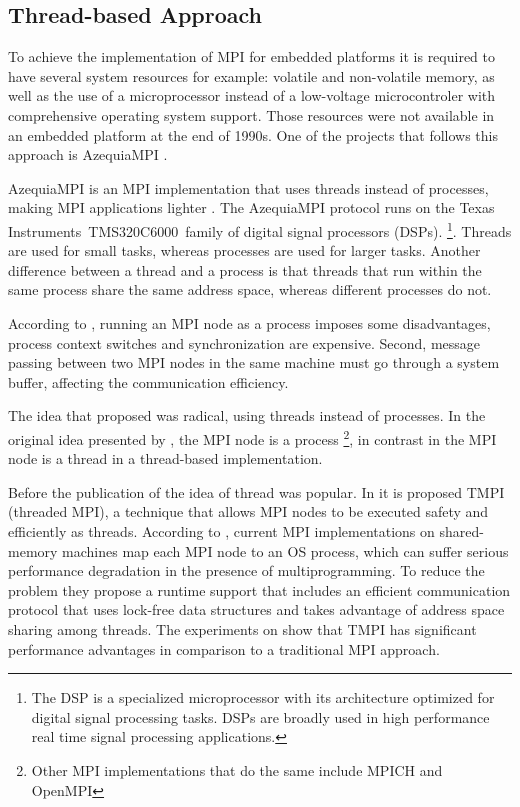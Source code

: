 
\subsection{Thread-based Approach}

To achieve the implementation of MPI for embedded platforms it is required to
have several system resources for example: volatile and non-volatile memory, as
well as the use of a microprocessor instead of a low-voltage microcontroler
with comprehensive operating system support. Those resources were not available
in an embedded platform at the end of 1990s.  One of the projects that follows
this approach is AzequiaMPI \cite{Gallego}.

AzequiaMPI is an MPI implementation that uses threads instead of processes,
making MPI applications lighter . The AzequiaMPI protocol runs on the Texas
Instruments\textregistered\ TMS320C6000\textregistered\ family of digital
signal processors (DSPs). \footnote{The DSP is a specialized microprocessor
with its architecture optimized for digital signal processing tasks. DSPs are
broadly used in high performance real time signal processing applications.}.
Threads are used for small tasks, whereas processes are used for larger tasks.
Another difference between a thread and a process is that threads that run
within the same process share the same address space, whereas different
processes do not.

According to \cite{Gallego}, running an MPI node as a process imposes some
disadvantages, process context switches and synchronization are expensive.
Second, message passing between two MPI nodes in the same machine must go
through a system buffer, affecting  the communication efficiency. 

The idea that \cite{Gallego} proposed was radical, using threads instead of
processes. In the original idea presented by \cite{Salim}, the MPI node  is a
process \footnote{Other MPI implementations that do the same include MPICH and
OpenMPI}, in contrast in \cite{Gallego} the MPI node is a thread in a
thread-based implementation.

Before the publication of \cite{Gallego} the idea of thread was popular.  In
\cite{Tang} it is proposed TMPI (threaded MPI), a technique that  allows MPI
nodes to be executed safety and efficiently as threads. According to
\cite{Tang}, current MPI implementations on shared-memory machines map each MPI
node to an OS process, which can suffer serious performance degradation in the
presence of multiprogramming. To reduce the problem they propose a runtime
support that includes an efficient communication protocol that uses lock-free
data structures and takes advantage of address space sharing among threads. The
experiments on \cite{Tang} show that TMPI has significant performance
advantages in comparison to a traditional MPI approach.

